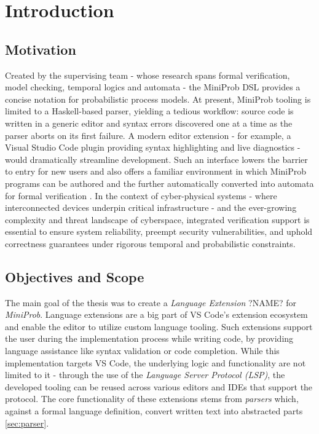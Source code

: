 \chapter{Introduction}
\section{Motivation}

Created by the supervising team - whose research spans formal verification, model checking, temporal logics and automata - the MiniProb DSL provides a concise notation
for probabilistic process models\cite{guideMiniProb}. At present, MiniProb tooling is limited to a Haskell-based parser, yielding a tedious workflow: source code is written
in a generic editor and syntax errors discovered one at a time as the parser aborts on its first failure. A modern editor extension - for example, a
Visual Studio Code plugin providing syntax highlighting and live diagnostics - would dramatically streamline development. Such an interface lowers the barrier to entry for
new users and also offers a familiar environment in which MiniProb programs can be authored and the further automatically converted into automata for formal verification \cite{2025modelcheckingprobabilisticoperator,POPACheck}.
In the context of cyber-physical systems - where interconnected devices underpin critical infrastructure - and the ever-growing complexity and threat landscape of cyberspace,
integrated verification support is essential to ensure system reliability, preempt security vulnerabilities, and uphold correctness guarantees under rigorous temporal and
probabilistic constraints.

\label{sec:scope}
\section{Objectives and Scope}
The main goal of the thesis was to create a \textit{Language Extension} ?NAME? for \textit{MiniProb}. Language extensions are a big part of
VS Code's extension ecosystem and enable the editor to utilize custom language tooling. Such extensions support the user during the implementation process
while writing code, by providing language assistance like syntax validation or code completion. While this implementation targets VS Code, the underlying
logic and functionality are not limited to it - through the use of the \textit{Language Server Protocol (LSP)}, the developed tooling can be reused across
various editors and IDEs that support the protocol. The core functionality of these extensions stems from \textit{parsers} which, against a formal language
definition, convert written text into abstracted parts \ref{sec:parser}.


